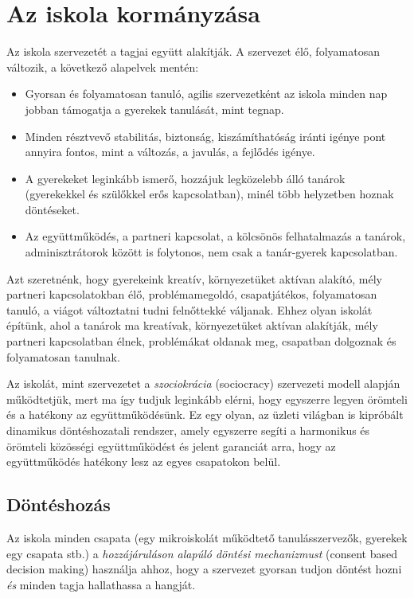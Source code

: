 \section{Az iskola kormányzása}
\label{sec:az_iskola_kormanyzasa}
Az iskola szervezetét a tagjai együtt alakítják. A szervezet élő,
folyamatosan változik, a következő alapelvek mentén:

\begin{itemize}

\item
  Gyorsan és folyamatosan tanuló, agilis szervezetként az iskola minden
  nap jobban támogatja a gyerekek tanulását, mint tegnap.
\item
  Minden résztvevő stabilitás, biztonság, kiszámíthatóság iránti igénye
  pont annyira fontos, mint a változás, a javulás, a fejlődés igénye.
\item
  A gyerekeket leginkább ismerő, hozzájuk legközelebb álló tanárok
  (gyerekekkel és szülőkkel erős kapcsolatban), minél több helyzetben
  hoznak döntéseket.
\item
  Az együttműködés, a partneri kapcsolat, a kölcsönös felhatalmazás a
  tanárok, adminisztrátorok között is folytonos, nem csak a tanár-gyerek
  kapcsolatban.
\end{itemize}

Azt szeretnénk, hogy gyerekeink kreatív, környezetüket aktívan alakító,
mély partneri kapcsolatokban élő, problémamegoldó, csapatjátékos,
folyamatosan tanuló, a viágot változtatni tudni felnőttekké váljanak.
Ehhez olyan iskolát építünk, ahol a tanárok ma kreatívak, környezetüket
aktívan alakítják, mély partneri kapcsolatban élnek, problémákat oldanak
meg, csapatban dolgoznak és folyamatosan tanulnak.

Az iskolát, mint szervezetet a \emph{szociokrácia} (sociocracy)
szervezeti modell alapján működtetjük, mert ma így tudjuk leginkább
elérni, hogy egyszerre legyen örömteli és a hatékony az
együttműködésünk. Ez egy olyan, az üzleti világban is kipróbált
dinamikus döntéshozatali rendszer, amely egyszerre segíti a harmonikus
és örömteli közösségi együttműködést és jelent garanciát arra, hogy az
együttműködés hatékony lesz az egyes csapatokon belül.


\subsection{Döntéshozás}
\label{sec:consent_based}

Az iskola minden csapata (egy mikroiskolát működtető tanulásszervezők,
gyerekek egy csapata stb.) a \emph{hozzájáruláson alapúló döntési
mechanizmust} (consent based decision making) használja ahhoz, hogy a
szervezet gyorsan tudjon döntést hozni \emph{és} minden tagja
hallathassa a hangját.

